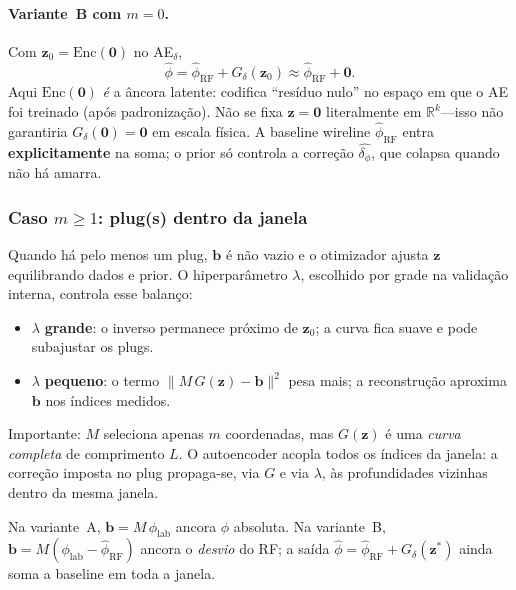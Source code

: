 \documentclass[11pt,a4paper]{article}
\newcommand{\deltaphi}{\ensuremath{\delta_{\phi}}}
\newcommand{\zvec}{\ensuremath{\mathbf{z}}}
\newcommand{\zzero}{\ensuremath{\mathbf{z}_0}}
\begin{document}
\paragraph{Variante~B com $m=0$.}
Com $\zzero=\mathrm{Enc}(\mathbf{0})$ no AE$_{\delta}$,
\begin{equation}
  \widehat{\phi}
  =
  \widehat{\phi}_{\mathrm{RF}}
  +
  G_{\delta}(\zzero)
  \approx
  \widehat{\phi}_{\mathrm{RF}} + \mathbf{0}.
  \label{eq:clp_b_m0}
\end{equation}
Aqui $\mathrm{Enc}(\mathbf{0})$ \emph{é} a âncora latente: codifica
``resíduo nulo'' no espaço em que o AE foi treinado (após
padronização).
Não se fixa $\zvec=\mathbf{0}$ literalmente em $\mathbb{R}^k$---isso
não garantiria $G_{\delta}(\mathbf{0})=\mathbf{0}$ em escala física.
A baseline wireline $\widehat{\phi}_{\mathrm{RF}}$ entra
\textbf{explicitamente} na soma; o prior só controla a correção
$\widehat{\deltaphi}$, que colapsa quando não há amarra.

\subsubsection{Caso \texorpdfstring{$m\ge 1$}{m>=1}: plug(s) dentro da janela}

Quando há pelo menos um plug, $\mathbf{b}$ é não vazio e o otimizador
ajusta $\zvec$ equilibrando dados e prior.
O hiperparâmetro $\lambda$, escolhido por grade na validação interna,
controla esse balanço:
\begin{itemize}
  \item $\lambda$ \textbf{grande}: o inverso permanece próximo de $\zzero$;
        a curva fica suave e pode subajustar os plugs.
  \item $\lambda$ \textbf{pequeno}: o termo $\|M\,G(\zvec)-\mathbf{b}\|^2$
        pesa mais; a reconstrução aproxima $\mathbf{b}$ nos índices medidos.
\end{itemize}

Importante: $M$ seleciona apenas $m$ coordenadas, mas $G(\zvec)$ é uma
\emph{curva completa} de comprimento $L$.
O autoencoder acopla todos os índices da janela: a correção imposta no
plug propaga-se, via $G$ e via $\lambda$, às profundidades vizinhas
dentro da mesma janela.

Na variante~A, $\mathbf{b}=M\,\phi_{\mathrm{lab}}$ ancora $\phi$ absoluta.
Na variante~B, $\mathbf{b}=M(\phi_{\mathrm{lab}}-\widehat{\phi}_{\mathrm{RF}})$
ancora o \emph{desvio} do RF; a saída
$\widehat{\phi}=\widehat{\phi}_{\mathrm{RF}}+G_{\delta}(\zvec^{\ast})$
ainda soma a baseline em toda a janela.
\end{document}
